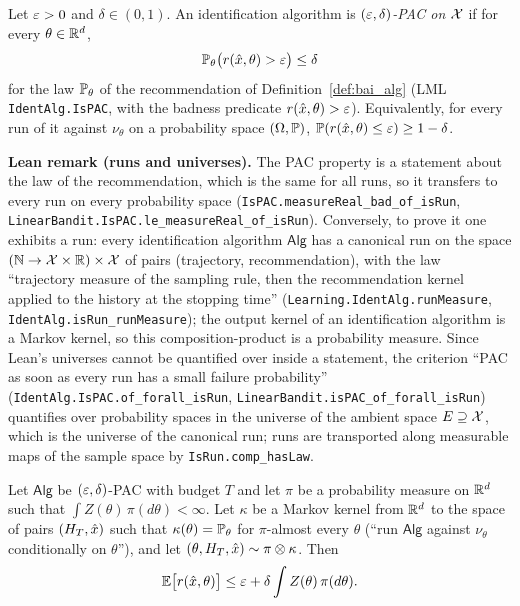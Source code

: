 \begin{definition}\label{def:pac}
\leanok
{}
Let $\varepsilon > 0$ and $\delta \in (0,1)$. An identification algorithm is
\emph{$(\varepsilon,\delta)$-PAC on $\mathcal{X}$} if for every $\theta \in \mathbb{R}^d$,
\[
  \mathbb{P}_\theta\big( r(\hat{x}, \theta) > \varepsilon \big) \le \delta
\]
for the law $\mathbb{P}_\theta$ of the recommendation of Definition~\ref{def:bai_alg} (LML
\texttt{IdentAlg.IsPAC}, with the badness predicate $r(\hat{x},\theta) > \varepsilon$). Equivalently,
for every run of it against $\nu_\theta$ on a probability space $(\Omega,\mathbb{P})$,
$\mathbb{P}( r(\hat{x}, \theta) \le \varepsilon ) \ge 1 - \delta$.
\end{definition}

\textbf{Lean remark (runs and universes).} The PAC property is a statement about the law of
the recommendation, which is the same for all runs, so it transfers to every run on every
probability space (\texttt{IsPAC.measureReal\_bad\_of\_isRun},
\texttt{LinearBandit.IsPAC.le\_measureReal\_of\_isRun}). Conversely, to prove it one exhibits
a run: every identification algorithm $\mathsf{Alg}$ has a canonical run on the space
$(\mathbb{N} \to \mathcal{X}\times\mathbb{R})\times\mathcal{X}$ of pairs (trajectory, recommendation), with the law
``trajectory measure of the sampling rule, then the recommendation kernel applied to the history
at the stopping time'' (\texttt{Learning.IdentAlg.runMeasure},
\texttt{IdentAlg.isRun\_runMeasure}); the output kernel of an identification algorithm is a
Markov kernel, so this composition-product is a probability measure. Since Lean's universes
cannot be quantified over inside a statement, the criterion ``PAC as soon as every run has a
small failure probability'' (\texttt{IdentAlg.IsPAC.of\_forall\_isRun},
\texttt{LinearBandit.isPAC\_of\_forall\_isRun}) quantifies over probability spaces in the
universe of the ambient space $E \supseteq \mathcal{X}$, which is the universe of the canonical run;
runs are transported along measurable maps of the sample space by \texttt{IsRun.comp\_hasLaw}.

\begin{lemma}\label{lem:pac_expected_regret}
\leanok
{}
Let $\mathsf{Alg}$ be $(\varepsilon,\delta)$-PAC with budget $T$ and let $\pi$ be a probability
measure on $\mathbb{R}^d$ such that $\int Z(\theta)\,\pi(d\theta) < \infty$. Let $\kappa$ be a Markov
kernel from $\mathbb{R}^d$ to the space of pairs $(H_T, \hat{x})$ such that $\kappa(\theta) = \mathbb{P}_\theta$
for $\pi$-almost every $\theta$ (``run $\mathsf{Alg}$ against $\nu_\theta$ conditionally on
$\theta$''), and let $(\theta, H_T, \hat{x}) \sim \pi \otimes \kappa$. Then
\[
  \mathbb{E}\big[ r(\hat{x}, \theta) \big] \le \varepsilon + \delta \int Z(\theta)\, \pi(d\theta) .
\]
\end{lemma}


